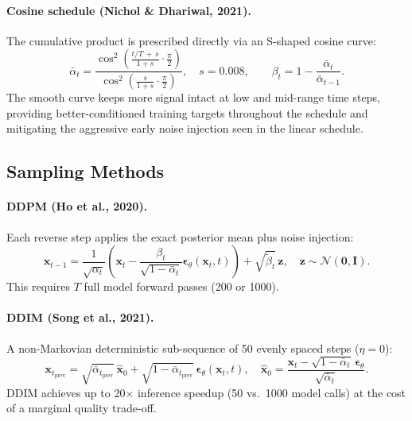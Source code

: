 \documentclass[11pt,a4paper]{article}
\begin{document}
\paragraph{Cosine schedule \normalfont\small(Nichol \& Dhariwal, 2021).}
The cumulative product is prescribed directly via an S-shaped cosine curve:
\begin{equation}
  \bar\alpha_t =
  \frac{\cos^2\!\left(\tfrac{t/T\,+\,s}{1+s}\cdot\tfrac{\pi}{2}\right)}
       {\cos^2\!\left(\tfrac{s}{1+s}\cdot\tfrac{\pi}{2}\right)},
  \quad s=0.008,
  \qquad
  \beta_t = 1 - \frac{\bar\alpha_t}{\bar\alpha_{t-1}}.
\end{equation}
The smooth curve keeps more signal intact at low and mid-range time steps,
providing better-conditioned training targets throughout the schedule and
mitigating the aggressive early noise injection seen in the linear schedule.

\subsection{Sampling Methods}

\paragraph{DDPM \normalfont\small(Ho et al., 2020).}
Each reverse step applies the exact posterior mean plus noise injection:
\begin{equation}
  \mathbf{x}_{t-1} = \frac{1}{\sqrt{\alpha_t}}\!\left(
    \mathbf{x}_t - \frac{\beta_t}{\sqrt{1-\bar\alpha_t}}
    \boldsymbol\epsilon_\theta(\mathbf{x}_t, t)
  \right) + \sqrt{\tilde\beta_t}\,\mathbf{z},
  \quad \mathbf{z}\sim\mathcal{N}(\mathbf{0},\mathbf{I}).
\end{equation}
This requires $T$ full model forward passes (200 or 1000).

\paragraph{DDIM \normalfont\small(Song et al., 2021).}
A non-Markovian deterministic sub-sequence of 50 evenly spaced steps ($\eta=0$):
\begin{equation}
  \mathbf{x}_{t_{\text{prev}}} =
    \sqrt{\bar\alpha_{t_{\text{prev}}}}\,\hat{\mathbf{x}}_0
    + \sqrt{1-\bar\alpha_{t_{\text{prev}}}}\,
      \boldsymbol\epsilon_\theta(\mathbf{x}_t,t),
  \quad
  \hat{\mathbf{x}}_0 = \frac{\mathbf{x}_t - \sqrt{1-\bar\alpha_t}\,\boldsymbol\epsilon_\theta}
                             {\sqrt{\bar\alpha_t}}.
\end{equation}
DDIM achieves up to 20$\times$ inference speedup (50 vs.\ 1000 model calls)
at the cost of a marginal quality trade-off.
\end{document}
